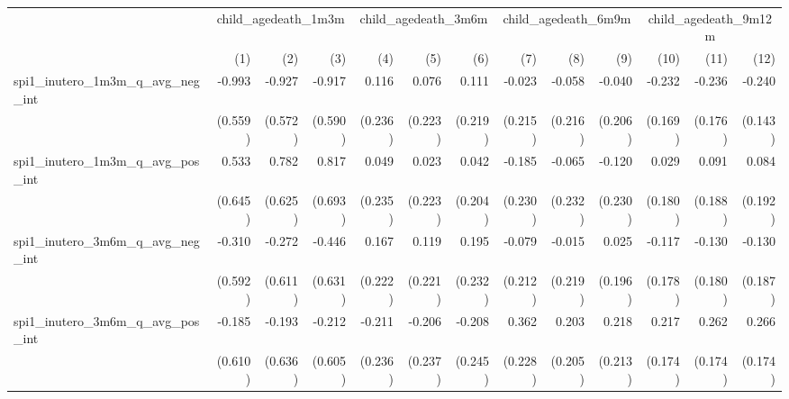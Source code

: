 \begin{tabular}{lrrrrrrrrrrrr}
\toprule
                                            &  \multicolumn{3}{c}{child\_agedeath\_1m3m} &  \multicolumn{3}{c}{child\_agedeath\_3m6m} &  \multicolumn{3}{c}{child\_agedeath\_6m9m} & \multicolumn{3}{c}{child\_agedeath\_9m12m} \\ 
\cmidrule(lr){2-4} \cmidrule(lr){5-7} \cmidrule(lr){8-10} \cmidrule(lr){11-13} 
                                            &          (1) &          (2) &          (3) &          (4) &          (5) &          (6) &          (7) &          (8) &          (9) &         (10) &         (11) &         (12) \\ 
\midrule
spi1\_inutero\_1m3m\_q\_avg\_neg\_int       &       -0.993 &       -0.927 &       -0.917 &        0.116 &        0.076 &        0.111 &       -0.023 &       -0.058 &       -0.040 &       -0.232 &       -0.236 &       -0.240 \\ 
                                            &      (0.559) &      (0.572) &      (0.590) &      (0.236) &      (0.223) &      (0.219) &      (0.215) &      (0.216) &      (0.206) &      (0.169) &      (0.176) &      (0.143) \\ 
spi1\_inutero\_1m3m\_q\_avg\_pos\_int       &        0.533 &        0.782 &        0.817 &        0.049 &        0.023 &        0.042 &       -0.185 &       -0.065 &       -0.120 &        0.029 &        0.091 &        0.084 \\ 
                                            &      (0.645) &      (0.625) &      (0.693) &      (0.235) &      (0.223) &      (0.204) &      (0.230) &      (0.232) &      (0.230) &      (0.180) &      (0.188) &      (0.192) \\ 
spi1\_inutero\_3m6m\_q\_avg\_neg\_int       &       -0.310 &       -0.272 &       -0.446 &        0.167 &        0.119 &        0.195 &       -0.079 &       -0.015 &        0.025 &       -0.117 &       -0.130 &       -0.130 \\ 
                                            &      (0.592) &      (0.611) &      (0.631) &      (0.222) &      (0.221) &      (0.232) &      (0.212) &      (0.219) &      (0.196) &      (0.178) &      (0.180) &      (0.187) \\ 
spi1\_inutero\_3m6m\_q\_avg\_pos\_int       &       -0.185 &       -0.193 &       -0.212 &       -0.211 &       -0.206 &       -0.208 &        0.362 &        0.203 &        0.218 &        0.217 &        0.262 &        0.266 \\ 
                                            &      (0.610) &      (0.636) &      (0.605) &      (0.236) &      (0.237) &      (0.245) &      (0.228) &      (0.205) &      (0.213) &      (0.174) &      (0.174) &      (0.174) \\ 

\end{tabular}
